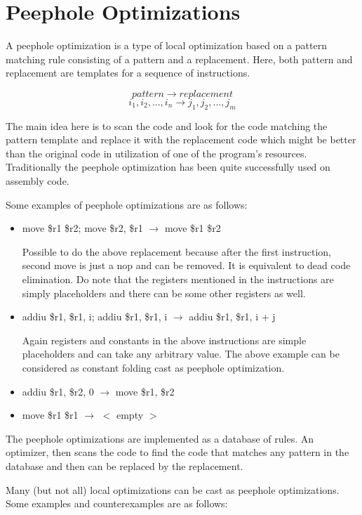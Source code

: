 \section{Peephole Optimizations}

A peephole optimization is a type of local optimization based on a pattern matching rule consisting of a pattern and a replacement. Here, both pattern and replacement are templates for a sequence of instructions.

\[pattern \rightarrow replacement\]
\[i_1, i_2, ... , i_n \rightarrow j_1, j_2, ..., j_m\]

The main idea here is to scan the code and look for the code matching the pattern template and replace it with the replacement code which might be better than the original code in utilization of one of the program's resources. Traditionally the peephole optimization has been quite successfully used on assembly code.

Some examples of peephole optimizations are as follows:

\begin{itemize}
    \item move \$r1 \$r2; move \$r2, \$r1 $\rightarrow$ move \$r1 \$r2
    
    Possible to do the above replacement because after the first instruction, second move is just a nop and can be removed. It is equivalent to dead code elimination. Do note that the registers mentioned in the instructions are simply placeholders and there can be some other registers as well. 
    \item addiu \$r1, \$r1, i; addiu \$r1, \$r1, i $\rightarrow$ addiu \$r1, \$r1, i + j
    
    Again registers and constants in the above instructions are simple placeholders and can take any arbitrary value. The above example can be considered as constant folding cast as peephole optimization.
    \item addiu \$r1, \$r2, 0 $\rightarrow$ move \$r1, \$r2
    \item move \$r1 \$r1 $\rightarrow$ \(<\) empty \(>\)
\end{itemize}

The peephole optimizations are implemented as a database of rules. An optimizer, then scans the code to find the code that matches any pattern in the database and then can be replaced by the replacement.

Many (but not all) local optimizations can be cast as peephole optimizations. Some examples and counterexamples are as follows:

